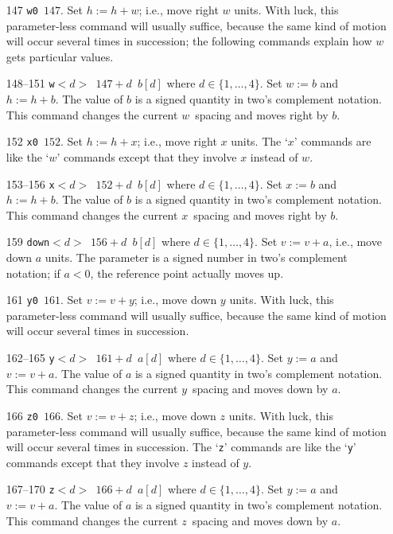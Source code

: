 \documentclass[10pt, a4paper]{article}
\begin{document}
\begin{itemize}
\item[147] \texttt{w0 $147$}. 
Set $h:=h+w$; i.e., move right $w$ units. With luck,
this parameter-less command will usually suffice, because the same kind of motion
will occur several times in succession; the following commands explain how
$w$ gets particular values. 

\item[148--151] \texttt{w$<d>$ $147+d$ $b[d]$} where $d\in\{1,\dots,4\}$. 
Set $w:=b$ and $h:=h+b$. 
The value of $b$ is a signed quantity in two's complement notation. 
This command changes the current $w$~spacing and moves right by $b$.


\item[152] \texttt{x0 $152$}. 
Set $h:=h+x$; i.e., move right $x$ units. The `$x$'
commands are like the `$w$' commands except that they involve $x$ instead
of $w$.

\item[153--156] \texttt{x$<d>$ $152+d$ $b[d]$} where $d\in\{1,\dots,4\}$. 
Set $x:=b$ and $h:=h+b$. 
The value of $b$ is a signed quantity in two's complement notation. 
This command changes the current $x$~spacing and moves right by $b$.


\item[159] \texttt{down$<d>$ $156+d$ $b[d]$} where $d\in\{1,\dots,4\}$. 
Set $v:=v+a$, i.e., move down $a$ units. 
The parameter is a signed number in two's complement notation; 
if $a<0$, the reference point actually moves up.


\item[161] \texttt{y0 $161$}. 
Set $v:=v+y$; i.e., move down $y$ units. 
With luck, this parameter-less command will usually suffice, 
because the same kind of motion will occur several times in succession.

\item[162--165] \texttt{y$<d>$ $161+d$ $a[d]$} where $d\in\{1,\dots,4\}$. 
Set $y:=a$ and $v:=v+a$. 
The value of $a$ is a signed quantity in two's complement notation. 
This command changes the current $y$~spacing and moves down by $a$. 

\item[166] \texttt{z0 $166$}. 
Set $v:=v+z$; i.e., move down $z$ units. 
With luck, this parameter-less command will usually suffice, 
because the same kind of motion will occur several times in succession.
The `\texttt{z}' commands are like the `\texttt{y}' commands 
except that they involve $z$ instead of $y$. 

\item[167--170] \texttt{z$<d>$ $166+d$ $a[d]$} where $d\in\{1,\dots,4\}$. 
Set $y:=a$ and $v:=v+a$. 
The value of $a$ is a signed quantity in two's complement notation. 
This command changes the current $z$~spacing and moves down by $a$. 



\end{itemize}
\end{document}
